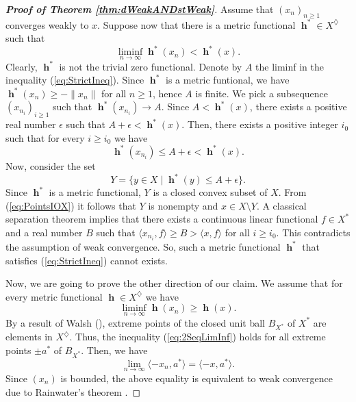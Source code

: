 \documentclass[a4paper,12pt]{article}
\theoremstyle{definition}
\DeclareMathOperator{\h}{\mathbf{h}}
\newcommand{\norm}[1]{\lVert#1\rVert}
\newcommand{\dpair}[2]{\langle#1, #2\rangle}
\numberwithin{equation}{section}
\begin{document}
\begin{proof}[\bf Proof of Theorem \ref{thm:dWeakANDstWeak}]
Assume that $(x_n)_{n\geq 1}$ converges weakly to $x$. Suppose now that there is a metric 
functional $\h^* \in X^\diamondsuit$ such that
\begin{equation}\label{eq:StrictIneq}
	\liminf_{n\to\infty} \h^*(x_n) < \h^*(x).    
\end{equation}
Clearly, $\h^*$ is not the trivial zero functional. Denote by $A$ the liminf in the inequality 
(\ref{eq:StrictIneq}). Since $\h^*$ is a metric funtional, we have $\h^*(x_n)\geq -\norm{x_n}$ 
for all $n\geq 1$, hence $A$ is finite. We pick a subsequence $(x_{n_i})_{i\geq 1}$ such that 
$\h^*(x_{n_i})\to A$. Since $A < \h^*(x)$, there exists a positive real number $\epsilon$ such 
that $A+\epsilon < \h^*(x)$. Then, there exists a positive integer $i_0$ such that for every
$i\geq i_0$ we have
\begin{equation}\label{eq:PointsIOX}
	\h^*(x_{n_i}) \leq A +\epsilon <\h^*(x).
\end{equation}
Now, consider the set 
$$ 
	Y = \{ y\in X \mid \h^*(y) \leq A+\epsilon \}.
$$
Since $\h^*$ is a metric functional, $Y$ is a closed convex subset of $X$. From 
(\ref{eq:PointsIOX}) it follows that $Y$ is nonempty and $x\in X\setminus Y$. A classical 
separation theorem implies that there exists a continuous linear functional $f\in X^*$ and a real 
number $B$ such that $\dpair{x_{n_i}}{f} \geq B > \dpair{x}{f}$ for all $i \geq i_0$. This 
contradicts the assumption of weak convergence. So, such a metric functional $\h^*$ that 
satisfies (\ref{eq:StrictIneq}) cannot exists. 
	
Now, we are going to prove the other direction of our claim. We assume that for every metric 
functional $\h\in X^\diamondsuit$ we have
\begin{equation}\label{eq:2SeqLimInf}
	\liminf_{n\to\infty}\h(x_n)\geq \h(x).
\end{equation}
By a result of Walsh (\cite[Corollary 3.5]{Walsh2018}), extreme points of the closed 
unit ball $B_{X^*}$ of $X^*$ are elements in $X^\diamondsuit$. Thus, the inequality (\ref{eq:2SeqLimInf})
holds for all extreme points $\pm a^*$ of $B_{X^*}$. Then, we have
$$ 
	\lim_{n\to\infty}\dpair{-x_n}{a^*} =  \dpair{-x}{a^*}.
$$
Since $(x_n)$ is bounded, the above equality is equivalent to weak convergence due to Rainwater's
theorem \cite{Rainwater1963}.
\end{proof}
\end{document}
